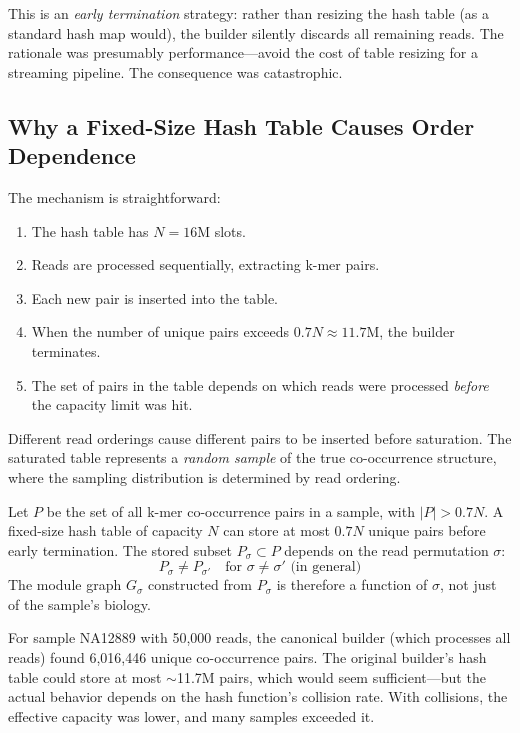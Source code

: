 \documentclass{../yalumba}
\begin{document}
This is an \textit{early termination} strategy: rather than resizing the hash
table (as a standard hash map would), the builder silently discards all remaining
reads. The rationale was presumably performance---avoid the cost of table
resizing for a streaming pipeline. The consequence was catastrophic.

\subsection{Why a Fixed-Size Hash Table Causes Order Dependence}

The mechanism is straightforward:

\begin{enumerate}[leftmargin=2em]
  \item The hash table has $N = 16\text{M}$ slots.
  \item Reads are processed sequentially, extracting k-mer pairs.
  \item Each new pair is inserted into the table.
  \item When the number of unique pairs exceeds $0.7N \approx 11.7\text{M}$,
    the builder terminates.
  \item The set of pairs in the table depends on which reads were processed
    \textit{before} the capacity limit was hit.
\end{enumerate}

Different read orderings cause different pairs to be inserted before saturation.
The saturated table represents a \textit{random sample} of the true co-occurrence
structure, where the sampling distribution is determined by read ordering.

\begin{definition}
Let $P$ be the set of all k-mer co-occurrence pairs in a sample, with $|P| > 0.7N$.
A fixed-size hash table of capacity $N$ can store at most $0.7N$ unique pairs
before early termination. The stored subset $P_\sigma \subset P$ depends on the
read permutation $\sigma$:
\begin{equation}
  P_\sigma \neq P_{\sigma'} \quad \text{for } \sigma \neq \sigma' \text{ (in general)}
\end{equation}
The module graph $G_\sigma$ constructed from $P_\sigma$ is therefore a function
of $\sigma$, not just of the sample's biology.
\end{definition}

For sample NA12889 with 50,000 reads, the canonical builder (which processes all
reads) found 6,016,446 unique co-occurrence pairs. The original builder's hash
table could store at most $\sim$11.7M pairs, which would seem sufficient---but the
actual behavior depends on the hash function's collision rate. With collisions,
the effective capacity was lower, and many samples exceeded it.
\end{document}
